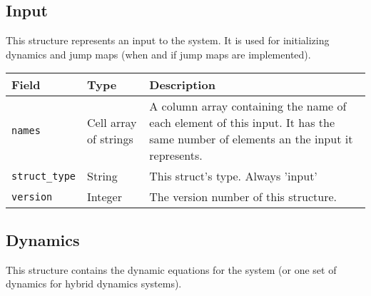 \documentclass{article}
\begin{document}
		\subsection{Input}
			\label{sec:input} %

			This structure represents an input to the system. It is used for initializing dynamics and jump maps (when and if
			jump maps are implemented).

			\vspace{\baselineskip}

			\begin{tabular}{ p{} | p{} | p{}}
				Field                    & Type                               & Description                                            \\ \hline
				\lstinline|names|        & \raggedright Cell array of strings & A column array containing the name of each element of
				                                                                this input. It has the same number of elements an the
				                                                                input it represents.                                   \\[1ex]
				\lstinline|struct_type|  & String                             & This struct's type. Always 'input'                     \\
				\lstinline|version|      & Integer                            & The version number of this structure.                  \\
			\end{tabular}

		\subsection{Dynamics}
			\label{sec:dynamics} %

			This structure contains the dynamic equations for the system (or one set of dynamics for hybrid dynamics systems).

			\vspace{\baselineskip}
\end{document}
